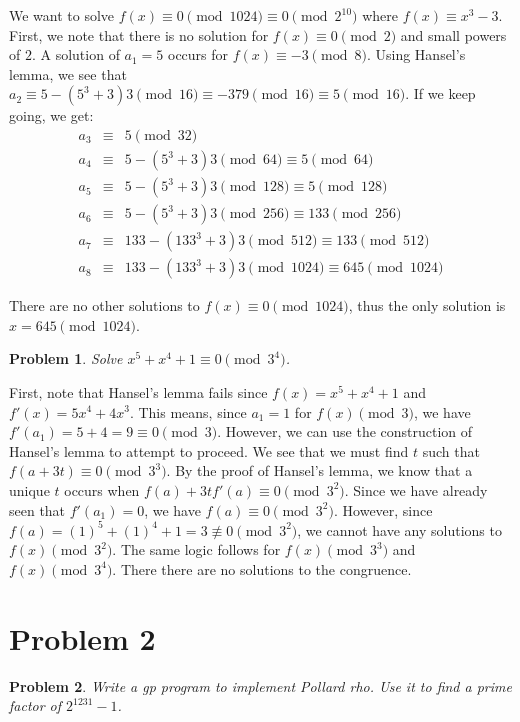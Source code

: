 \documentclass[psamsfonts]{amsart}
\newtheorem{prob}{Problem}[section]
\newenvironment{sol}{{\bfseries Solution}}{\qedsymbol}
\theoremstyle{definition}
\theoremstyle{remark}
\numberwithin{equation}{section}
\begin{document}
\begin{sol}
We want to solve $f(x) \equiv 0 \pmod{1024} \equiv 0 \pmod{2^{10}}$ where $f(x) \equiv x^3 - 3$. First, we note that there is no solution for $f(x) \equiv 0 \pmod{2}$ and small powers of $2$. A solution of $a_1 = 5$ occurs for $f(x) \equiv -3 \pmod{8}$. Using Hansel's lemma, we see that $a_2 \equiv 5 - (5^3 + 3) 3 \pmod{16} \equiv -379 \pmod{16} \equiv 5 \pmod{16}$. If we keep going, we get:
\begin{eqnarray}
a_3 &\equiv& 5 \pmod {32} \\
a_4 &\equiv& 5 - (5^3 + 3) 3 \pmod{64} \equiv 5 \pmod{64} \\
a_5 &\equiv& 5 - (5^3 + 3) 3 \pmod{128} \equiv 5 \pmod{128} \\
a_6 &\equiv& 5 - (5^3 + 3) 3 \pmod{256} \equiv 133 \pmod{256} \\
a_7 &\equiv& 133 - (133^3 + 3) 3 \pmod{512} \equiv 133 \pmod{512} \\
a_8 &\equiv& 133 - (133^3 + 3) 3 \pmod{1024} \equiv 645 \pmod{1024}
\end{eqnarray}

There are no other solutions to $f(x) \equiv 0 \pmod{1024}$, thus the only solution is $x = 645 \pmod{1024}$. 
\end{sol}

\begin{prob}
Solve $x^5 + x^4 + 1 \equiv 0 \pmod{3^4}$. 
\end{prob}

\begin{sol}
First, note that Hansel's lemma fails since $f(x) = x^5 + x^4 + 1$ and $f'(x) = 5 x^4 + 4x^3$. This means, since $a_1 = 1$ for $f(x) \pmod{3}$, we have $f'(a_1) = 5 + 4 = 9 \equiv 0 \pmod{3}$. However, we can use the construction of Hansel's lemma to attempt to proceed. We see that we must find $t$ such that $f(a + 3t) \equiv 0 \pmod{3^3}$. By the proof of Hansel's lemma, we know that a unique $t$ occurs when $f(a) + 3t f'(a) \equiv 0 \pmod{3^2}$. Since we have already seen that $f'(a_1) = 0$, we have $f(a) \equiv 0 \pmod{3^2}$. However, since $f(a) = (1)^5 + (1)^4 + 1 = 3 \not \equiv 0 \pmod{3^2}$, we cannot have any solutions to $f(x) \pmod{3^2}$. The same logic follows for $f(x) \pmod{3^3}$ and $f(x) \pmod{3^4}$. There there are no solutions to the congruence.
\end{sol}

\section{Problem 2}
\begin{prob}
Write a gp program to implement Pollard rho. Use it to find a prime factor of $2^{1231} - 1$.
\end{prob}
\end{document}
